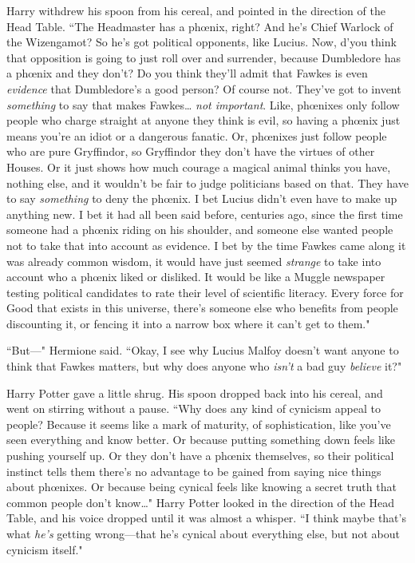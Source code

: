 Harry withdrew his spoon from his cereal, and pointed in the direction of the Head Table. ``The Headmaster has a phœnix, right? And he's Chief Warlock of the Wizengamot? So he's got political opponents, like Lucius. Now, d'you think that opposition is going to just roll over and surrender, because Dumbledore has a phœnix and they don't? Do you think they'll admit that Fawkes is even \emph{evidence} that Dumbledore's a good person? Of course not. They've got to invent \emph{something} to say that makes Fawkes{\ldots} \emph{not important}. Like, phœnixes only follow people who charge straight at anyone they think is evil, so having a phœnix just means you're an idiot or a dangerous fanatic. Or, phœnixes just follow people who are pure Gryffindor, so Gryffindor they don't have the virtues of other Houses. Or it just shows how much courage a magical animal thinks you have, nothing else, and it wouldn't be fair to judge politicians based on that. They have to say \emph{something} to deny the phœnix. I bet Lucius didn't even have to make up anything new. I bet it had all been said before, centuries ago, since the first time someone had a phœnix riding on his shoulder, and someone else wanted people not to take that into account as evidence. I bet by the time Fawkes came along it was already common wisdom, it would have just seemed \emph{strange} to take into account who a phœnix liked or disliked. It would be like a Muggle newspaper testing political candidates to rate their level of scientific literacy. Every force for Good that exists in this universe, there's someone else who benefits from people discounting it, or fencing it into a narrow box where it can't get to them."

``But—" Hermione said. ``Okay, I see why Lucius Malfoy doesn't want anyone to think that Fawkes matters, but why does anyone who \emph{isn't} a bad guy \emph{believe} it?"

Harry Potter gave a little shrug. His spoon dropped back into his cereal, and went on stirring without a pause. ``Why does any kind of cynicism appeal to people? Because it seems like a mark of maturity, of sophistication, like you've seen everything and know better. Or because putting something down feels like pushing yourself up. Or they don't have a phœnix themselves, so their political instinct tells them there's no advantage to be gained from saying nice things about phœnixes. Or because being cynical feels like knowing a secret truth that common people don't know{\ldots}" Harry Potter looked in the direction of the Head Table, and his voice dropped until it was almost a whisper. ``I think maybe that's what \emph{he's} getting wrong—that he's cynical about everything else, but not about cynicism itself."

